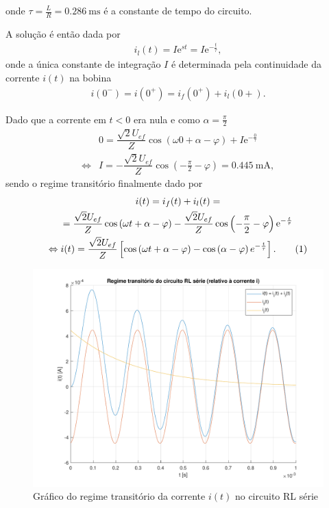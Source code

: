 \documentclass[a4paper, titlepage, portuguese]{article}
\newcommand{\eq}{\Leftrightarrow} %
\newcommand\numberthis{\addtocounter{equation}{1}\tag{\theequation}}
\newcommand\e{\mathrm{e} }
\begin{document}
		onde $\tau = \frac{L}{R} = \SI{0.286}{\milli\second}$ é a constante de tempo do circuito.
		\par
		A solução é então dada por
		\begin{align*}
			i_l(t) = I \e^{st} = I \e^{-\frac{t}{\tau}},
		\end{align*}
		onde a única constante de integração $I$ é determinada pela continuidade da corrente $i(t)$ na bobina
		\begin{align*}
			i(0^-) = i(0^+) = i_f(0^+) + i_l(0+).
		\end{align*}
		\par
		Dado que a corrente em $t < 0$ era nula e como $\alpha = \frac{\pi}{2}$
		\begin{align*}
			&0 =  \dfrac{\sqrt{2}U_{ef}}{Z} \cos\left(\omega 0 + \alpha - \varphi\right) + I \e^{-\frac{0}{\tau}} \\ \eq
			&I = - \dfrac{\sqrt{2}U_{ef}}{Z} \cos\left(- \frac{\pi}{2} - \varphi\right) = \SI{0.445}{\milli\ampere},
		\end{align*}
		sendo o regime transitório finalmente dado por
		\begin{gather*}
			i(t) = i_f(t) + i_l(t) = \\ =
			\dfrac{\sqrt{2}U_{ef}}{Z} \cos\left(\omega t + \alpha - \varphi\right) - \dfrac{\sqrt{2}U_{ef}}{Z} \cos\left(- \frac{\pi}{2} - \varphi\right) \e^{-\frac{t}{\tau}} \\ \eq
			i(t) = \dfrac{\sqrt{2}U_{ef}}{Z} \left[ \cos\left(\omega t + \alpha - \varphi\right) - \cos\left(\alpha - \varphi\right)e^{-\frac{t}{\tau}}\right] . \numberthis \label{eq:trans_RL_sol}
		\end{gather*}

		\begin{figure}[H]
			\centering
			\includegraphics[width=1.0\linewidth]{rl.pdf}
			\caption{Gráfico do regime transitório da corrente $i(t)$ no circuito RL série}
			\label{fig:rl}
		\end{figure}
\end{document}
